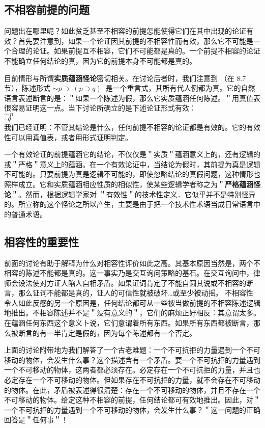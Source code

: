 \subsection{不相容前提的问题}

问题出在哪里呢？如此贫乏甚至不相容的前提怎能使得它们在其中出现的论证有效？首先要注意到，如果一个论证因其前提的不相容性而有效，那么它不可能是一个合理的论证。如果前提互不相容，它们不可能都是真的。一个前提不相容的论证不能确立任何结论的真，因为它的前提本身不可能都是真的。

目前情形与所谓\textbf{实质蕴涵怪论}密切相关。在讨论后者时，我们注意到 （在 8.7 节），陈述形式 $\sim p \supset ~(p \supset q) ~$ 是一个重言式，其所有代人例都为真。它的自然语言表述断言的是：＂如果一个陈述为假，那么它实质蕴涵任何陈述。＂用真值表很容易证明这一点。当下讨论所确立的是下述论证形式有效：\\
$\sim p$\\
$\therefore q$\\
我们已经证明：不管其结论是什么，任何前提不相容的论证都是有效的。它的有效性可以用真值表，或者用形式证明判定。

一个有效论证的前提蕴涵它的结论，不仅仅是＂实质＂蕴涵意义上的，还有逻辑的或＂严格＂意义上的蕴涵。在一个有效论证中，当结论为假时，其前提为真是逻辑不可能的。只要前提为真是逻辑不可能的，即使忽略结论的真假问题，这种情形也照样成立。它和实质蕴涵相应性质的相似性，使某些逻辑学者称之为＂\textbf{严格蕴涵怪论}＂。然而，根据逻辑学家对 ＂有效性＂的技术性定义．它似乎并不是特别怪异的。所宣称的这个怪论之所以产生，主要是由于把一个技术性术语当成日常语言中的普通术语。

\subsection{相容性的重要性}

前面的讨论有助于解释为什么对相容性评价如此之高。其基本原因当然是，两个不相容的陈述不能都是真的。这一事实乃是交互询问策略的基石。在交互询问中，律师会设法使对方证人陷人自相矛盾。如果证词肯定了不能自圆其说或不相容的断言，那么证词不能都是真的，证人的可信性就被破坏…或至少被动摇。\cite{wigmore1937} 不相容性令人如此反感的另一个原因是，任何结论都可从一些被当做前提的不相容陈述逻辑地推出。不相容陈述并不是＂没有意义的＂，它们的麻烦正好相反：其意谓太多。在蕴涵任何东西这个意义卜说，它们意谓着所有东西。如果所有东西都被断言，那么被断言的有一半肯定是假的，因为每个陈述都有一个否定。

上面的讨论附带地为我们解答了一个古老难题：一个不可抗拒的力量遇到一个不可移动的物体，会发生什么事？这个描述含有一个矛盾。要一个不可抗拒的力量遇到一个不可移动的物体，这两者都必须存在。必定存在一个不可抗拒的力量，并且也必定存在一个不可移动的物体。但如果存在不可抗拒的力量，就不会存在不可移动的物体。在此，矛盾被表述得很清楚：存在一个不可移动的物体，并且不存在一个不可移动的物体。给定这种不相容的前提，任何结论都可有效地推出。因此，对＂一个不可抗拒的力量遇到一个不可移动的物体，会发生什么事？＂这一问题的正确回答是＂任何事＂！

